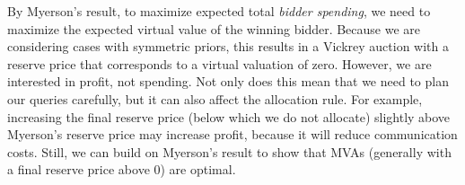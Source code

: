 By Myerson's result, to maximize expected total {\em bidder spending}, we need to
maximize the expected virtual value of the winning bidder.  
Because we are considering cases with symmetric priors, this results in a
Vickrey auction with a reserve price that corresponds to a virtual
valuation of zero.
However, we are
interested in profit, not spending.  Not only does this mean that we need
to plan our queries carefully, but it can also affect the allocation rule.
For example, increasing the final reserve price (below which we do not
allocate) slightly above Myerson's reserve price may increase profit,
because it will reduce communication costs.  Still, we can build on
Myerson's result to show that MVAs (generally with a final reserve price
above $0$) are optimal.





